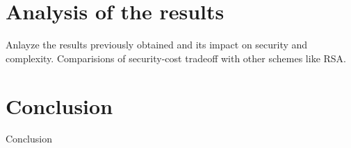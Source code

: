 \documentclass{acm_proc_article-sp}
\begin{document}
\section{Analysis of the results}

Anlayze the results previously obtained and its impact on security and complexity. Comparisions of security-cost tradeoff with other schemes like RSA.
\section{Conclusion}
Conclusion\\\\\\\\\\\\\\\\\\\\\\\\\\\\\\\\\\\\\\\\\\\\\\\\\\\\\\\\\\\\\

%
%
\balancecolumns
\end{document}
